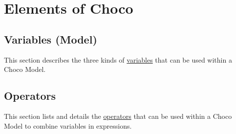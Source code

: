 


%
%
%

\part{Elements of Choco}\label{part:elements}\hypertarget{part:elements}{}
\chapter{Variables (Model)}\label{ch:vars}\hypertarget{ch:vars}{}
This section describes the three kinds of \hyperlink{model:variables}{variables} that can be used within a Choco Model.



\chapter{Operators}\label{ch:operators}\hypertarget{ch:operators}{}
This section lists and details the \hyperlink{model:expressionvariables}{operators} that can be used within a Choco Model to combine variables in expressions.

















